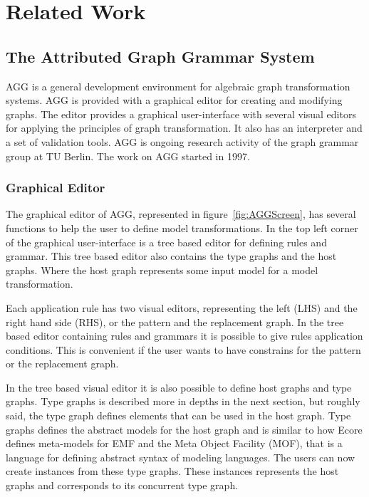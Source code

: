 
\chapter{Related Work} %

\label{Chapter5} %


\section{The Attributed Graph Grammar System}

AGG is a general development environment for algebraic graph
transformation systems. AGG is provided with a graphical editor for creating
and modifying graphs. The editor provides a graphical user-interface with
several visual editors for applying the principles of graph transformation. It
also has an interpreter and a set of validation tools. AGG is ongoing research
activity of the graph grammar group at TU Berlin. The work on AGG started in 1997.

\subsection{Graphical Editor}
The graphical editor of AGG, represented in
figure~\ref{fig:AGGScreen}, has several functions to help the user to define
model transformations. In the top left corner of the graphical user-interface
is a tree based editor for defining rules and grammar. This tree based editor
also contains the type graphs and the host graphs. Where the host graph
represents some input model for a model transformation.

Each application rule has two visual editors, representing the left
(LHS) and the right hand side (RHS), or the pattern and the replacement graph.
In the tree based editor containing rules and grammars it is possible to give
rules application conditions. This is convenient if the user wants to have
constrains for the pattern or the replacement graph.

In the tree based visual editor it is also possible to define host
graphs and type graphs. Type graphs is described more in depths in the next
section, but roughly said, the type graph defines elements that can be used in
the host graph. Type graphs defines the abstract models for the host graph and
is similar to how Ecore defines meta-models  for EMF and the Meta Object
Facility (MOF)\cite{MOF}, that is a language for defining abstract syntax of
modeling languages. The users can now create instances from these type graphs.
These instances represents the host graphs and corresponds to its concurrent
type graph.

